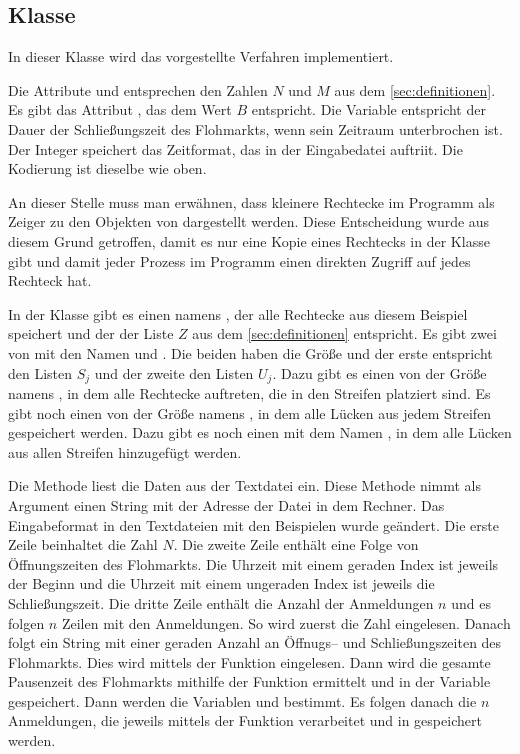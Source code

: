 \subsection{Klasse }
In dieser Klasse wird das vorgestellte Verfahren implementiert.

Die Attribute  und  entsprechen den Zahlen $N$ und $M$
aus dem \cref{sec:definitionen}. Es gibt das Attribut , das dem
Wert $B$ entspricht. Die Variable  entspricht der
Dauer der Schließungszeit des Flohmarkts, wenn sein Zeitraum unterbrochen ist.
Der Integer  speichert das Zeitformat, das in der Eingabedatei
auftriit. Die Kodierung ist dieselbe wie oben.

An dieser Stelle muss man erwähnen, dass kleinere Rechtecke im Programm als Zeiger zu 
den Objekten von  dargestellt werden.
Diese Entscheidung wurde aus diesem Grund getroffen, damit 
es nur eine Kopie eines Rechtecks in der Klasse  gibt und
damit jeder Prozess im Programm einen direkten Zugriff auf jedes Rechteck hat.

In der Klasse  gibt es einen  namens ,
der alle Rechtecke aus diesem Beispiel speichert und der der Liste $Z$
aus dem \cref{sec:definitionen} entspricht.
Es gibt zwei  von  mit den Namen 
 und . Die beiden 
haben die Größe  und der erste entspricht den Listen $S_j$ und
der zweite den Listen $U_j$.
Dazu gibt es einen  von  der Größe  namens ,
in dem alle Rechtecke auftreten, die in den Streifen platziert sind.
Es gibt noch einen  von  der Größe  namens ,
in dem alle Lücken aus jedem Streifen gespeichert werden. 
Dazu gibt es noch einen  mit dem Namen , in dem alle Lücken
aus allen Streifen hinzugefügt werden.

Die Methode  liest die Daten aus der Textdatei ein.
Diese Methode nimmt als Argument einen String mit der Adresse der Datei in dem Rechner.
Das Eingabeformat in den Textdateien mit den Beispielen wurde geändert.
Die erste Zeile beinhaltet die Zahl $N$. Die zweite Zeile enthält
eine Folge von Öffnungszeiten des Flohmarkts. Die Uhrzeit mit einem geraden Index ist jeweils der
Beginn und die Uhrzeit mit einem ungeraden Index ist jeweils die Schließungszeit.
Die dritte Zeile enthält die Anzahl der Anmeldungen $n$ und es folgen $n$ Zeilen mit den Anmeldungen.
So wird zuerst die Zahl  eingelesen. 
Danach folgt ein String mit einer geraden Anzahl an Öffnugs-- und Schließungszeiten des Flohmarkts.
Dies wird mittels der Funktion  eingelesen.
Dann wird die gesamte Pausenzeit des Flohmarkts mithilfe der Funktion  ermittelt
und in der Variable  gespeichert. 
Dann werden die Variablen  und  bestimmt.
Es folgen danach die $n$ Anmeldungen,
die jeweils mittels der Funktion  verarbeitet und
in  gespeichert werden.

